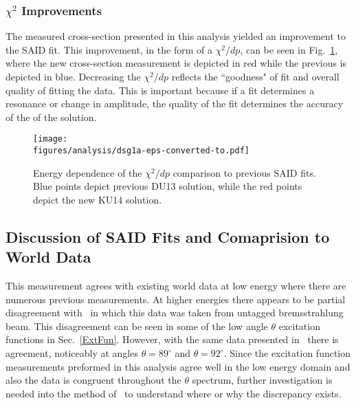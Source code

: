 \FloatBarrier
\subsubsection{$\chi^2$ Improvements}\label{sec:chi}
The measured cross-section presented in this analysis yielded an improvement to the SAID fit. This improvement, in the form of a $\chi^2/dp$, can be seen in Fig.~\ref{fig:chi_sq}, where the new cross-section measurement is depicted in red while the previous is depicted in blue. Decreasing the $\chi^2/dp$ reflects the ``goodness" of fit and overall quality of fitting the data. This is important because if a fit determines a resonance or change in amplitude, the quality of the fit determines the accuracy of the of the solution.  
\begin{figure}[h!]\begin{center}
\texttt{[image: \\figures/analysis/dsg1a-eps-converted-to.pdf]}
\caption[Energy dependence of the $\chi^2/dp$ comparison to previous SAID fits]{\label{fig:chi_sq}Energy dependence of the $\chi^2/dp$ comparison to previous SAID fits. Blue points depict previous DU13 solution, while the red points depict the new KU14 solution.}
\end{center}\end{figure} 
\FloatBarrier
%
%
\subsection{Discussion of SAID Fits and Comaprision to World Data}\label{sec:discussion}
This measurement agrees with existing world data at low energy where there are numerous previous measurements. At higher energies there appears to be partial disagreement with~\cite{brem} in which this data was taken from untagged bremsstrahlung beam. This disagreement can be seen in some of the low angle $\theta$ excitation functions in Sec.~\ref{ExtFun}. However, with the same data presented in~\cite{brem} there is agreement, noticeably at angles $\theta = 89^\circ$ and $\theta = 92^\circ$. Since the excitation function measurements preformed in this analysis agree well in the low energy domain and also the data is congruent throughout the $\theta$ spectrum, further investigation is needed into the method of~\cite{brem} to understand where or why the discrepancy exists.
%
%
\FloatBarrier
